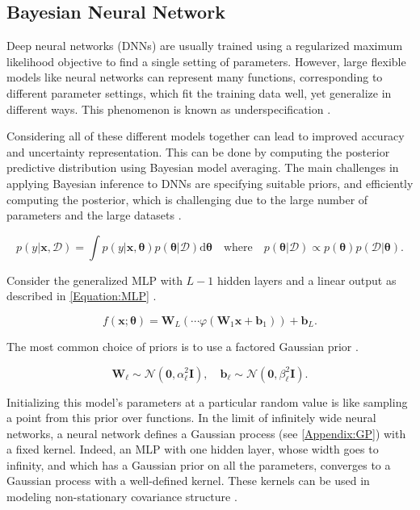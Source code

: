 \documentclass[../../../main.tex]{subfiles}
\begin{document}
\subsection{Bayesian Neural Network}

Deep neural networks (DNNs) are usually trained using a regularized maximum likelihood objective to find a single setting of parameters. However, large flexible models like neural networks can represent many functions, corresponding to different parameter settings, which fit the training data well, yet generalize in different ways. This phenomenon is known as underspecification \autocite{Murphy2023}.

Considering all of these different models together can lead to improved accuracy and uncertainty representation. This can be done by computing the posterior predictive distribution using Bayesian model averaging. The main challenges in applying Bayesian inference to DNNs are specifying suitable priors, and efficiently computing the posterior, which is challenging due to the large number of parameters and the large datasets \autocite{Murphy2023}.

\begin{equation}
p(y|\bm{x},\mathcal{D}) = \int p(y|\bm{x},\bm{\theta})p(\bm{\theta}|\mathcal{D})\mathrm{d}\bm{\theta} \quad \text{where} \quad p(\bm{\theta}|\mathcal{D}) \propto p(\bm{\theta})p(\mathcal{D}|\bm{\theta}).
\end{equation}

Consider the generalized MLP with $L-1$ hidden layers and a linear output as described in \autoref{Equation:MLP} \autocite{Murphy2023}.

\begin{equation}
f(\bm{x};\bm{\theta}) = \bm{W}_L(\cdots\varphi(\bm{W}_1\bm{x}+\bm{b}_1))+\bm{b}_L.
\end{equation}

The most common choice of priors is to use a factored Gaussian prior \autocite{Murphy2023}.

\begin{equation}
\bm{W}_\ell \sim \mathcal{N}(\bm{0},\alpha_\ell^2\bm{I}), \quad \bm{b}_\ell \sim \mathcal{N}(\bm{0},\beta_\ell^2\bm{I}).
\end{equation}

Initializing this model's parameters at a particular random value is like sampling a point from this prior over functions. In the limit of infinitely wide neural networks, a neural network defines a Gaussian process (see \autoref{Appendix:GP}) with a fixed kernel. Indeed, an MLP with one hidden layer, whose width goes to infinity, and which has a Gaussian prior on all the parameters, converges to a Gaussian process with a well-defined kernel. These kernels can be used in modeling non-stationary covariance structure \autocite{Murphy2023}. 
\end{document}

